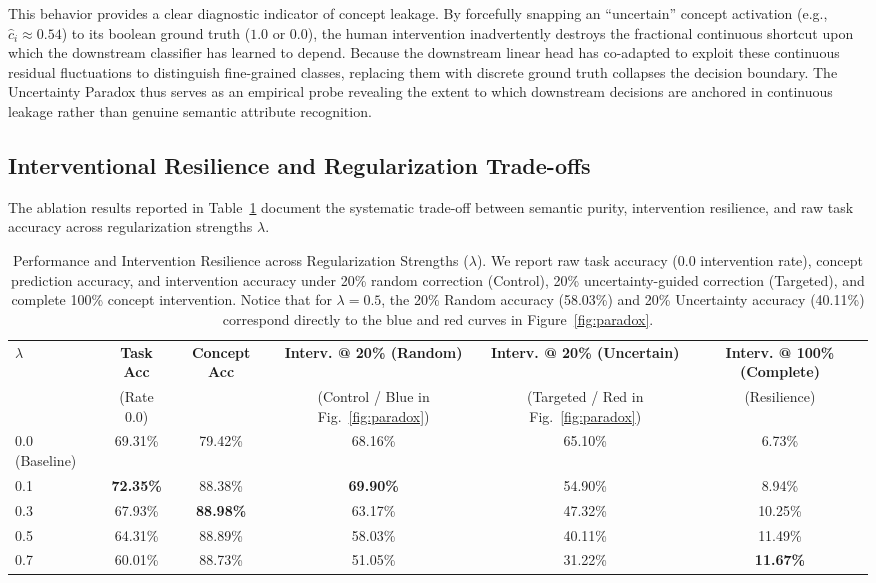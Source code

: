 \documentclass[times,twocolumn,final]{elsarticle}
\begin{document}
This behavior provides a clear diagnostic indicator of concept leakage. By forcefully snapping an ``uncertain'' concept activation (e.g., $\hat{c}_i \approx 0.54$) to its boolean ground truth ($1.0$ or $0.0$), the human intervention inadvertently destroys the fractional continuous shortcut upon which the downstream classifier has learned to depend. Because the downstream linear head has co-adapted to exploit these continuous residual fluctuations to distinguish fine-grained classes, replacing them with discrete ground truth collapses the decision boundary. The Uncertainty Paradox thus serves as an empirical probe revealing the extent to which downstream decisions are anchored in continuous leakage rather than genuine semantic attribute recognition.

\subsection{Interventional Resilience and Regularization Trade-offs}

The ablation results reported in Table~\ref{tab:ablation} document the systematic trade-off between semantic purity, intervention resilience, and raw task accuracy across regularization strengths $\lambda$. 

\begin{table}[htbp]
\small
\caption{Performance and Intervention Resilience across Regularization Strengths ($\lambda$). We report raw task accuracy (0.0 intervention rate), concept prediction accuracy, and intervention accuracy under 20\% random correction (Control), 20\% uncertainty-guided correction (Targeted), and complete 100\% concept intervention. Notice that for $\lambda=0.5$, the 20\% Random accuracy (58.03\%) and 20\% Uncertainty accuracy (40.11\%) correspond directly to the blue and red curves in Figure~\ref{fig:paradox}.}
\centering
\begin{tabular}{|l|c|c|c|c|c|}
\hline
\textbf{$\lambda$} & \textbf{Task Acc} & \textbf{Concept Acc} & \textbf{Interv. @ 20\% (Random)} & \textbf{Interv. @ 20\% (Uncertain)} & \textbf{Interv. @ 100\% (Complete)} \\
 & (Rate 0.0) & & (Control / Blue in Fig.~\ref{fig:paradox}) & (Targeted / Red in Fig.~\ref{fig:paradox}) & (Resilience) \\
\hline
0.0 (Baseline) & 69.31\% & 79.42\% & 68.16\% & 65.10\% & 6.73\% \\
0.1            & \textbf{72.35\%} & 88.38\% & \textbf{69.90\%} & 54.90\% & 8.94\% \\
0.3            & 67.93\% & \textbf{88.98\%} & 63.17\% & 47.32\% & 10.25\% \\
0.5            & 64.31\% & 88.89\% & 58.03\% & 40.11\% & 11.49\% \\
0.7            & 60.01\% & 88.73\% & 51.05\% & 31.22\% & \textbf{11.67\%} \\
\hline
\end{tabular}
\label{tab:ablation}
\end{table}
\end{document}
